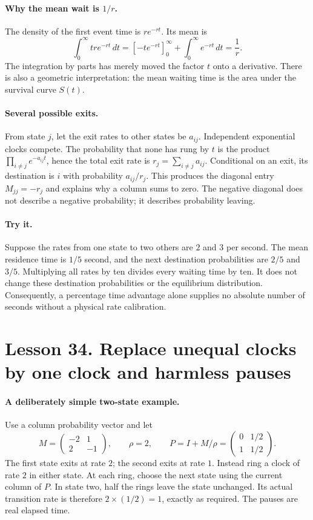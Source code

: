 \paragraph{Why the mean wait is $1/r$.}
The density of the first event time is $re^{-rt}$. Its mean is
\[
 \int_0^\infty t r e^{-rt}\,dt
 =[-te^{-rt}]_0^\infty+\int_0^\infty e^{-rt}\,dt=\frac1r.
\]
The integration by parts has merely moved the factor $t$ onto a derivative.
There is also a geometric interpretation: the mean waiting time is the area
under the survival curve $S(t)$.

\paragraph{Several possible exits.}
From state $j$, let the exit rates to other states be $a_{ij}$.
Independent exponential clocks compete. The probability that none has rung
by $t$ is the product $\prod_{i\ne j}e^{-a_{ij}t}$, hence the total exit rate
is $r_j=\sum_{i\ne j}a_{ij}$. Conditional on an exit, its destination is $i$
with probability $a_{ij}/r_j$. This produces the diagonal entry
$M_{jj}=-r_j$ and explains why a column sums to zero. The negative diagonal
does not describe a negative probability; it describes probability leaving.

\paragraph{Try it.}
Suppose the rates from one state to two others are $2$ and $3$ per second.
The mean residence time is $1/5$ second, and the next destination probabilities
are $2/5$ and $3/5$. Multiplying all rates by ten divides every waiting time
by ten. It does not change these destination probabilities or the equilibrium
distribution. Consequently, a percentage time advantage alone supplies no
absolute number of seconds without a physical rate calibration.

\section*{Lesson 34. Replace unequal clocks by one clock and harmless pauses}
\paragraph{A deliberately simple two-state example.}
Use a column probability vector and let
\[
 M=\begin{pmatrix}-2&1\\2&-1\end{pmatrix},\qquad
 \rho=2,\qquad
 P=I+M/\rho=\begin{pmatrix}0&1/2\\1&1/2\end{pmatrix}.
\]
The first state exits at rate $2$; the second exits at rate $1$.
Instead ring a clock of rate $2$ in either state. At each ring, choose the
next state using the current column of $P$. In state two, half the rings
leave the state unchanged. Its actual transition rate is therefore
$2\times(1/2)=1$, exactly as required. The pauses are real elapsed time.

